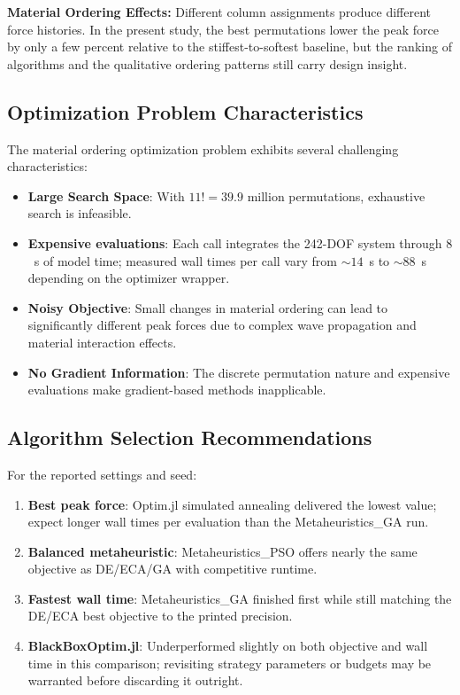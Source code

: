 \documentclass[11pt,a4paper]{article}
\begin{document}
\noindent \textbf{Material Ordering Effects:} Different column assignments produce different force histories. In the present study, the best permutations lower the peak force by only a few percent relative to the stiffest-to-softest baseline, but the ranking of algorithms and the qualitative ordering patterns still carry design insight. \newline

\subsection{Optimization Problem Characteristics}

\noindent The material ordering optimization problem exhibits several challenging characteristics:

\begin{itemize}
    \item \textbf{Large Search Space}: With $11! = 39.9$ million permutations, exhaustive search is infeasible.
    
    \item \textbf{Expensive evaluations}: Each call integrates the 242-DOF system through $8$~s of model time; measured wall times per call vary from $\sim 14$~s to $\sim 88$~s depending on the optimizer wrapper.
    
    \item \textbf{Noisy Objective}: Small changes in material ordering can lead to significantly different peak forces due to complex wave propagation and material interaction effects.
    
    \item \textbf{No Gradient Information}: The discrete permutation nature and expensive evaluations make gradient-based methods inapplicable.
\end{itemize}

\subsection{Algorithm Selection Recommendations}

\noindent For the reported settings and seed:

\begin{enumerate}
    \item \textbf{Best peak force}: Optim.jl simulated annealing delivered the lowest value; expect longer wall times per evaluation than the Metaheuristics\_GA run.
    \item \textbf{Balanced metaheuristic}: Metaheuristics\_PSO offers nearly the same objective as DE/ECA/GA with competitive runtime.
    \item \textbf{Fastest wall time}: Metaheuristics\_GA finished first while still matching the DE/ECA best objective to the printed precision.
    \item \textbf{BlackBoxOptim.jl}: Underperformed slightly on both objective and wall time in this comparison; revisiting strategy parameters or budgets may be warranted before discarding it outright.
\end{enumerate}
\end{document}
